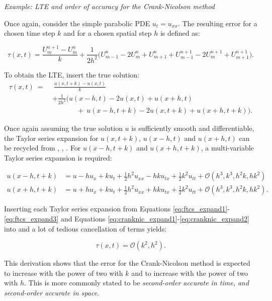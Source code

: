 \vspace{0.5cm}
\begin{tcolorbox}[colback=gray!5!white,colframe=gray!75!black]
\noindent\textit{Example: LTE and order of accuracy for the Crank-Nicolson method}

Once again, consider the simple parabolic PDE $u_t = u_{xx}$. The resulting error for a chosen time step $k$ and for a chosen spatial step $h$ is defined as: 

\begin{equation}
    \tau(x,t) = \frac{U_m^{n+1} - U_m^{n}}{k} + \frac{1}{2h^2} \bigg(U_{m-1}^{n} - 2U_{m}^{n} + U_{m+1}^n + U_{m-1}^{n+1} - 2U_{m}^{n+1} + U_{m+1}^{n+1}\bigg). 
\end{equation}

To obtain the LTE, insert the true solution: 
\begin{equation}
    \begin{aligned}
        \tau(x,t) \ = 
        \ & \ \frac{u(x,t+k) - u(x,t)}{k} \\ 
        \ & + \frac{1}{2h^2} \bigg(u(x-h, t) -2u(x,t) + u(x+h, t) \\
        \ & \quad\quad\quad \ \  + \ u(x-h, t+k) - 2u(x, t+k) + u(x+h, t+k) \bigg). 
    \end{aligned} \label{eq:cranknic_err}
\end{equation}

Once again assuming the true solution $u$ is sufficiently smooth and differentiable, the Taylor series expansion for $u(x,t+k)$, $u(x-h,t)$ and $u(x+h,t)$ can be recycled from , , . For $u(x-h, t+k)$ and $u(x+h, t+k)$, a multi-variable Taylor series expansion is required:

\begin{align}
    u(x-h, t+k) &= u - h u_x + k u_t + \frac{1}{2}h^2u_{xx} - hk u_{tx} + \frac{1}{2}k^2u_{tt} + \mathcal{O}(h^3, k^3, h^2k, hk^2) \label{eq:cranknic_expand1}\\
    u(x+h, t+k) &= u + h u_x + k u_t + \frac{1}{2}h^2u_{xx} + hk u_{tx} + \frac{1}{2}k^2u_{tt} + \mathcal{O}(h^3, k^3, h^2k, hk^2) \label{eq:cranknic_expand2}. 
\end{align}

Inserting each Taylor series expansion from Equations \ref{eq:ftcs_expand1}-\ref{eq:ftcs_expand3} and Equations \ref{eq:cranknic_expand1}-\ref{eq:cranknic_expand2} into  and a lot of tedious cancellation of terms yields: 

\begin{equation}
    \tau(x,t) = \mathcal{O}(k^2, h^2). 
\end{equation}

This derivation shows that the error for the Crank-Nicolson method is expected to increase with the power of two with $k$ and to increase with the power of two with $h$. This is more commonly stated to be \textit{second-order accurate in time, and second-order accurate in space}. 

\end{tcolorbox}

